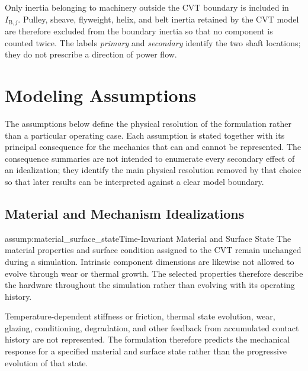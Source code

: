 \documentclass[11pt]{report}
\numberwithin{equation}{section}
\newcounter{assump}
\begin{document}
Only inertia belonging to machinery outside the CVT boundary is included in
\(I_{\mathrm{B},j}\). Pulley, sheave, flyweight, helix, and belt inertia
retained by the CVT model are therefore excluded from the boundary inertia so
that no component is counted twice. The labels \emph{primary} and
\emph{secondary} identify the two shaft locations; they do not prescribe a
direction of power flow.

\section{Modeling Assumptions}
\label{sec:assumptions}

The assumptions below define the physical resolution of the formulation rather
than a particular operating case. Each assumption is stated together with its
principal consequence for the mechanics that can and cannot be represented.
The consequence summaries are not intended to enumerate every secondary effect
of an idealization; they identify the main physical resolution removed by that
choice so that later results can be interpreted against a clear model boundary.

\subsection{Material and Mechanism Idealizations}

\begin{assumptionblock}{assump:material_surface_state}{Time-Invariant Material and Surface State}
The material properties and surface condition assigned to the CVT remain
unchanged during a simulation. Intrinsic component dimensions are likewise not
allowed to evolve through wear or thermal growth. The selected properties
therefore describe the hardware throughout the simulation rather than evolving
with its operating history.

\AssumptionConsequences
Temperature-dependent stiffness or friction, thermal state evolution, wear,
glazing, conditioning, degradation, and other feedback from accumulated
contact history are not represented. The formulation therefore predicts the
mechanical response for a specified material and surface state rather than the
progressive evolution of that state.
\end{assumptionblock}
\end{document}
